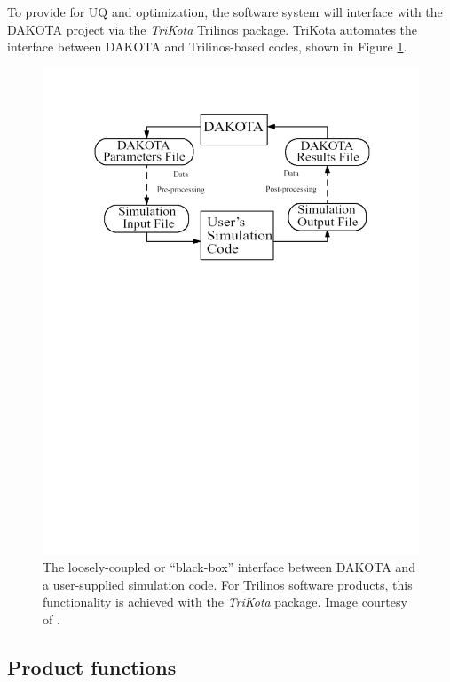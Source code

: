 \documentclass[10pt]{article}
\theoremstyle{plain}
\theoremstyle{definition}
\begin{document}
To provide for UQ and optimization, the software system will interface with the DAKOTA project via the \emph{TriKota} Trilinos package. TriKota automates the interface between DAKOTA and Trilinos-based codes, shown in Figure \ref{fig:DakotaInterface}.
\begin{figure}[h!]
  \begin{center}
   \includegraphics[scale=0.6]{Dakota}
   \end{center}
  \caption{The loosely-coupled or ``black-box'' interface between DAKOTA and a user-supplied simulation code. For Trilinos software products, this functionality is achieved with the \emph{TriKota} package. Image courtesy of \cite{Eldred:2008:Dakota}.}
  \label{fig:DakotaInterface}
\end{figure}

\subsection{Product functions}
\end{document}
